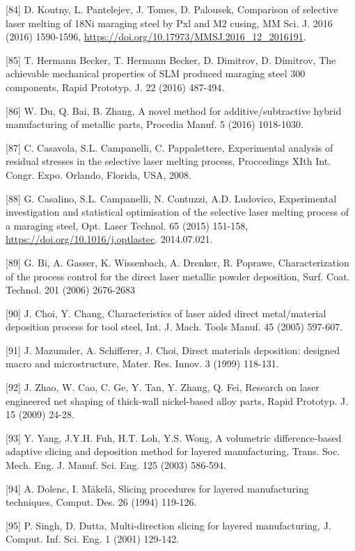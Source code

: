 \documentclass[10pt]{article}
\begin{document}
[84] D. Koutny, L. Pantelejev, J. Tomes, D. Palousek, Comparison of selective laser melting of 18Ni maraging steel by Pxl and M2 cusing, MM Sci. J. 2016 (2016) 1590-1596, \href{https://doi.org/10.17973/MMSJ.2016_12_2016191}{https://doi.org/10.17973/MMSJ.2016\_12\_2016191}.

[85] T. Hermann Becker, T. Hermann Becker, D. Dimitrov, D. Dimitrov, The achievable mechanical properties of SLM produced maraging steel 300 components, Rapid Prototyp. J. 22 (2016) 487-494.

[86] W. Du, Q. Bai, B. Zhang, A novel method for additive/subtractive hybrid manufacturing of metallic parts, Procedia Manuf. 5 (2016) 1018-1030.

[87] C. Casavola, S.L. Campanelli, C. Pappalettere, Experimental analysis of residual stresses in the selective laser melting process, Proccedings XIth Int. Congr. Expo. Orlando, Florida, USA, 2008.

[88] G. Casalino, S.L. Campanelli, N. Contuzzi, A.D. Ludovico, Experimental investigation and statistical optimisation of the selective laser melting process of a maraging steel, Opt. Laser Technol. 65 (2015) 151-158, \href{https://doi.org/10.1016/j.optlastec}{https://doi.org/10.1016/j.optlastec}. 2014.07.021.

[89] G. Bi, A. Gasser, K. Wissenbach, A. Drenker, R. Poprawe, Characterization of the process control for the direct laser metallic powder deposition, Surf. Coat. Technol. 201 (2006) 2676-2683

[90] J. Choi, Y. Chang, Characteristics of laser aided direct metal/material deposition process for tool steel, Int. J. Mach. Tools Manuf. 45 (2005) 597-607.

[91] J. Mazumder, A. Schifferer, J. Choi, Direct materials deposition: designed macro and microstructure, Mater. Res. Innov. 3 (1999) 118-131.

[92] J. Zhao, W. Cao, C. Ge, Y. Tan, Y. Zhang, Q. Fei, Research on laser engineered net shaping of thick-wall nickel-based alloy parts, Rapid Prototyp. J. 15 (2009) 24-28.

[93] Y. Yang, J.Y.H. Fuh, H.T. Loh, Y.S. Wong, A volumetric difference-based adaptive slicing and deposition method for layered manufacturing, Trans. Soc. Mech. Eng. J. Manuf. Sci. Eng. 125 (2003) 586-594.

[94] A. Dolenc, I. Mäkelä, Slicing procedures for layered manufacturing techniques, Comput. Des. 26 (1994) 119-126.

[95] P. Singh, D. Dutta, Multi-direction slicing for layered manufacturing, J. Comput. Inf. Sci. Eng. 1 (2001) 129-142.
\end{document}
